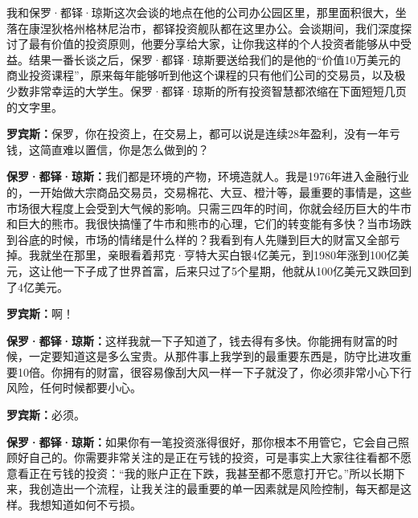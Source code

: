 我和保罗·都铎·琼斯这次会谈的地点在他的公司办公园区里，那里面积很大，坐落在康涅狄格州格林尼治市，都铎投资舰队都在这里办公。会谈期间，我们深度探讨了最有价值的投资原则，他要分享给大家，让你我这样的个人投资者能够从中受益。结果一番长谈之后，保罗·都铎·琼斯要送给我们的是他的“价值10万美元的商业投资课程”，原来每年能够听到他这个课程的只有他们公司的交易员，以及极少数非常幸运的大学生。保罗·都铎·琼斯的所有投资智慧都浓缩在下面短短几页的文字里。

\begin{BookQuote}
\textbf{罗宾斯：}保罗，你在投资上，在交易上，都可以说是连续28年盈利，没有一年亏钱，这简直难以置信，你是怎么做到的？
\end{BookQuote}

\begin{BookQuote}
\textbf{保罗·都铎·琼斯：}我们都是环境的产物，环境造就人。我是1976年进入金融行业的，一开始做大宗商品交易员，交易棉花、大豆、橙汁等，最重要的事情是，这些市场很大程度上会受到大气候的影响。只需三四年的时间，你就会经历巨大的牛市和巨大的熊市。我很快搞懂了牛市和熊市的心理，它们的转变能有多快？当市场跌到谷底的时候，市场的情绪是什么样的？我看到有人先赚到巨大的财富又全部亏掉。我就坐在那里，亲眼看着邦克·亨特大买白银4亿美元，到1980年涨到100亿美元，这让他一下子成了世界首富，后来只过了5个星期，他就从100亿美元又跌回到了4亿美元。
\end{BookQuote}

\begin{BookQuote}
\textbf{罗宾斯：}啊！
\end{BookQuote}

\begin{BookQuote}
\textbf{保罗·都铎·琼斯：}这样我就一下子知道了，钱去得有多快。你能拥有财富的时候，一定要知道这是多么宝贵。从那件事上我学到的最重要东西是，防守比进攻重要10倍。你拥有的财富，很容易像刮大风一样一下子就没了，你必须非常小心下行风险，任何时候都要小心。
\end{BookQuote}

\begin{BookQuote}
\textbf{罗宾斯：}必须。
\end{BookQuote}

\begin{BookQuote}
\textbf{保罗·都铎·琼斯：}如果你有一笔投资涨得很好，那你根本不用管它，它会自己照顾好自己的。你需要非常关注的是正在亏钱的投资，可是事实上大家往往看都不愿意看正在亏钱的投资：“我的账户正在下跌，我甚至都不愿意打开它。”所以长期下来，我创造出一个流程，让我关注的最重要的单一因素就是风险控制，每天都是这样。我想知道如何不亏损。
\end{BookQuote}

